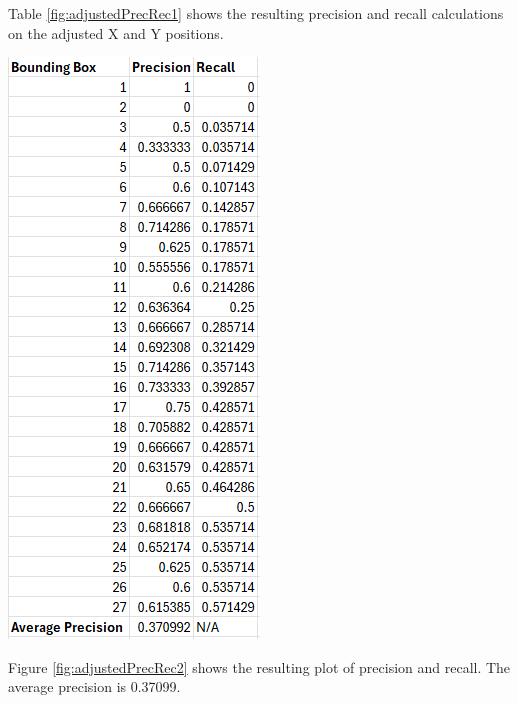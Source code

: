 \documentclass[man]{apa7}
\begin{document}
Table \ref{fig:adjustedPrecRec1} shows the resulting precision and recall calculations on the adjusted X and Y positions. 

\begin{minipage}{\linewidth}
  \includegraphics[]{figures/avgPrecRec.png}
  \label{fig:adjustedPrecRec1}
\end{minipage}

Figure \ref{fig:adjustedPrecRec2} shows the resulting plot of precision and recall. The average precision is 0.37099.

\newpage
\end{document}
